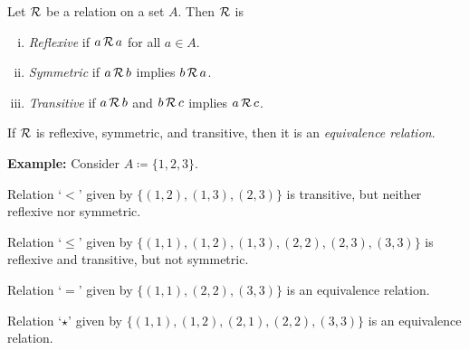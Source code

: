 \documentclass[10pt,aspectratio=149]{beamer}
\begin{document}
\begin{frame}

\begin{definition}
Let ${\mathcal{R}}$ be a relation on a set $A$.
\pause
Then ${\mathcal{R}}$ is
\begin{enumerate}[(i)]
\item
\emph{Reflexive} if $a\, {\mathcal{R}} \, a$ for
all $a \in A$.
\pause
\item
\emph{Symmetric} if $a\, {\mathcal{R}} \, b$ implies
$b \, {\mathcal{R}} \, a$.
\pause
\item
\emph{Transitive} if $a\, {\mathcal{R}} \, b$ and
$b \, {\mathcal{R}} \, c$ implies $a\, {\mathcal{R}} \, c$.
\end{enumerate}
\pause
If ${\mathcal{R}}$ is reflexive, symmetric, and transitive, then it is
an \emph{equivalence relation}.
\end{definition}
\pause

\textbf{Example:} Consider $A \coloneqq \{ 1,2,3 \}$.

\medskip
\pause

Relation `$<$' given by
$\bigl\{ (1,2), (1,3), (2,3) \bigr\}$
is transitive, but neither reflexive nor symmetric.

\medskip
\pause

Relation `$\leq$' given by
$\bigl\{ (1,1), (1,2), (1,3), (2,2), (2,3), (3,3) \bigr\}$
is reflexive and transitive, but not symmetric.

\medskip
\pause

Relation `$=$' given by
$\bigl\{ (1,1), (2,2), (3,3) \bigr\}$ is
an equivalence relation.

\medskip
\pause

Relation `$\star$' given by
$\bigl\{ (1,1), (1,2), (2,1), (2,2), (3,3) \bigr\}$ is
an equivalence relation.

\end{frame}
\end{document}
